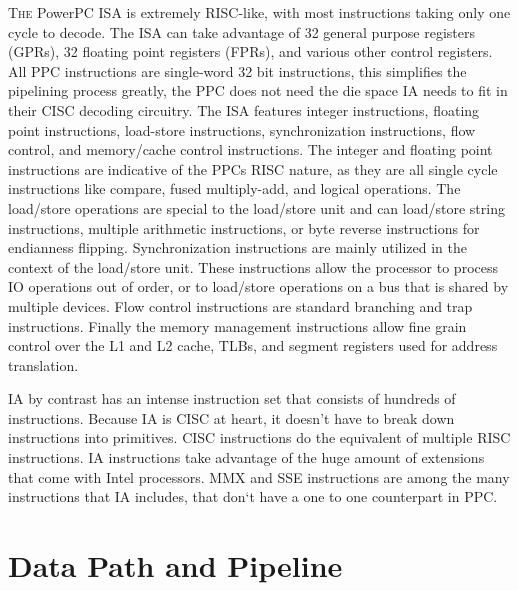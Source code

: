 \documentclass[10pt]{article}
\begin{document}
\textsc{The} PowerPC ISA is extremely RISC-like, with most instructions taking only one cycle to decode. The ISA can take advantage of 32 general purpose registers (GPRs), 32 floating point registers (FPRs), and various other control registers. All PPC instructions are single-word 32 bit instructions, this simplifies the pipelining process greatly, the PPC does not need the die space IA needs to fit in their CISC decoding circuitry. The ISA features integer instructions, floating point instructions, load-store instructions, synchronization instructions, flow control, and memory/cache control instructions.  The integer and floating point instructions are indicative of the PPCs RISC nature, as they are all single cycle instructions like compare, fused multiply-add, and logical operations. The load/store operations are special to the load/store unit and can load/store string instructions, multiple arithmetic instructions, or byte reverse instructions for endianness flipping. Synchronization instructions are mainly utilized in the context of the load/store unit. These instructions allow the processor to process IO operations out of order, or to load/store operations on a bus that is shared by multiple devices. Flow control instructions are standard branching and trap instructions. Finally the memory management instructions allow fine grain control over the L1 and L2 cache, TLBs, and segment registers used for address translation.  
\par
IA by contrast has an intense instruction set that consists of hundreds of instructions. Because IA is CISC at heart, it doesn’t have to break down instructions into primitives. CISC instructions do the equivalent of multiple RISC instructions. IA instructions take advantage of the huge amount of extensions that come with Intel processors. MMX and SSE instructions are among the many instructions that IA includes, that don`t have a one to one counterpart in PPC. 
\par

\section{Data Path and Pipeline}
\end{document}
